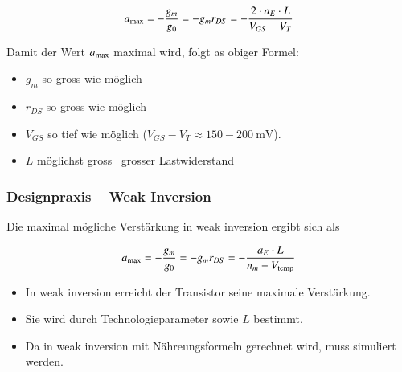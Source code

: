 \[
    a_{\rm max} = - \frac{g_m}{g_0} = -g_m r_{DS} = -\frac{2\cdot a_E \cdot L}{V_{GS} - V_T}
\]


Damit der Wert $a_{\rm max}$ maximal wird, folgt as obiger Formel:

\smallskip

\begin{minipage}[t]{0.35\columnwidth}
    \begin{itemize}
        \item $g_m$ so gross wie möglich
        \item $r_{DS}$ so gross wie möglich
    \end{itemize}
\end{minipage}
\hfill
\begin{minipage}[t]{0.62\columnwidth}
    \begin{itemize}
        \item $V_{GS}$ so tief wie möglich  ($V_{GS}-V_T \approx 150 - \qty{200}{\milli\volt}$).
        \item $L$ möglichst gross \textrightarrow\ grosser Lastwiderstand
    \end{itemize}
\end{minipage}



\subsubsection{Designpraxis -- Weak Inversion}

Die \textbf{} maximal mögliche Verstärkung in weak inversion ergibt sich als

\vspace{-0.2cm}

\[
    a_{\rm max} = - \frac{g_m}{g_0} = -g_m r_{DS} = -\frac{a_E \cdot L}{n_m - V_{\rm temp}}
\]


\begin{itemize}
    \item In weak inversion erreicht der Transistor seine maximale Verstärkung.
    \item Sie wird durch Technologieparameter sowie $L$ bestimmt.
    \item Da in weak inversion mit Nähreungsformeln gerechnet wird, muss simuliert werden.
\end{itemize}



